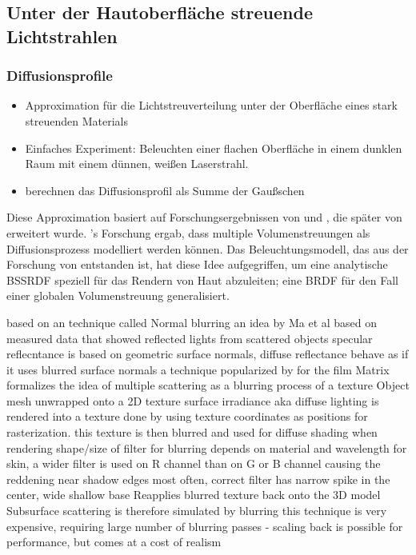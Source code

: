 \documentclass[ngerman,runningheads,a4paper]{llncs}[2018/03/10]
\begin{document}
\subsection{Unter der Hautoberfläche streuende Lichtstrahlen}
\label{sub:skin-subsurface-reflect}

\subsubsection{Diffusionsprofile}
\label{sub:diffusion-profiles}

\begin{itemize}
  \item Approximation für die Lichtstreuverteilung unter der Oberfläche eines stark streuenden Materials
  \item Einfaches Experiment: Beleuchten einer flachen Oberfläche in einem dunklen Raum mit einem dünnen, weißen Laserstrahl.
  \item berechnen das Diffusionsprofil als Summe der Gaußschen
\end{itemize}

Diese Approximation basiert auf Forschungsergebnissen von \citet{stam1995multiple} und \citet{spectral-bssrdf-human-skin}, die später von \citet{ma2007rapid} erweitert wurde.
\citeauthor{stam1995multiple}'s Forschung ergab, dass multiple Volumenstreuungen als Diffusionsprozess modelliert werden können.
Das Beleuchtungsmodell, das aus der Forschung von \citeauthor{spectral-bssrdf-human-skin} entstanden ist, hat diese Idee aufgegriffen, um eine analytische BSSRDF speziell für das Rendern von Haut abzuleiten; eine BRDF für den Fall einer globalen Volumenstreuung generalisiert.

based on an technique called Normal blurring
an idea by Ma et al based on measured data that showed reflected lights from scattered objects specular reflecntance is based on geometric surface normals, diffuse reflectance behave as if it uses blurred surface normals
a technique popularized by \citet{realistic-human-face-rendering-matrix} for the film Matrix formalizes the idea of multiple scattering as a blurring process of a texture
Object mesh unwrapped onto a 2D texture
surface irradiance aka diffuse lighting is rendered into a texture
done by using texture coordinates as positions for rasterization.
this texture is then blurred and used for diffuse shading when rendering
shape/size of filter for blurring depends on material and wavelength
  for skin, a wider filter is used on R channel than on G or B channel causing the reddening near shadow edges
  most often, correct filter has narrow spike in the center, wide shallow base
  Reapplies blurred texture back onto the 3D model
  Subsurface scattering is therefore simulated by blurring
this technique is very expensive, requiring large number of blurring passes - scaling back is possible for performance, but comes at a cost of realism
\end{document}
